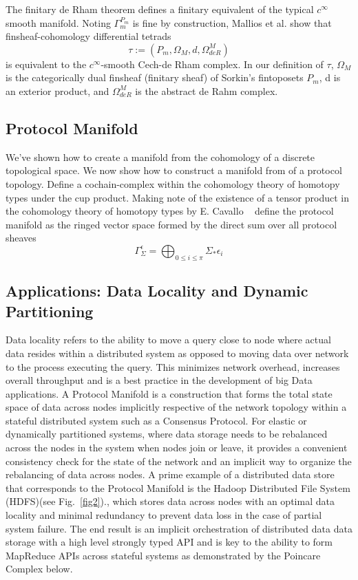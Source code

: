 \documentclass[runningheads]{llncs}
\begin{document}
The finitary de Rham theorem defines a finitary equivalent of the typical $c^{\infty}$ smooth manifold. Noting $\Gamma^{P_m}_m$ is fine by construction, Mallios et al. show that finsheaf-cohomology differential tetrads
\begin{equation}
\tau := (P_m, \Omega_M, d, \Omega^M_{deR})
\end{equation}
is equivalent to the $c^{\infty}$-smooth Cech-de Rham complex. In our definition of $\tau$, $\Omega_M$ is the categorically dual finsheaf (finitary sheaf) of Sorkin's  fintoposets $P_m$, d is an exterior product, and $ \Omega^M_{deR}$ is the abstract de Rahm complex.

\subsection{Protocol Manifold}
We've shown how to create a manifold from the cohomology of a discrete topological space. We now show how to construct a manifold from of a protocol topology. Define a cochain-complex within the cohomology theory of homotopy types under the cup product. Making note of the existence of a tensor product in the cohomology theory of homotopy types by E. Cavallo ~\cite{ref_article9} define the protocol manifold as the ringed vector space formed by the direct sum over all protocol sheaves
\begin{equation}
\Gamma^\epsilon_{\Sigma} = \bigoplus_{0 \leq i \leq \pi} \Sigma_* \epsilon_i
\end{equation}

\subsection{Applications: Data Locality and Dynamic Partitioning}
Data locality refers to the ability to move a query close to node where actual data resides within a distributed system as opposed to moving data over network to the process executing the query. This minimizes network overhead, increases overall throughput and is a best practice in the development of big Data applications. A Protocol Manifold is a construction that forms the total state space of data across nodes implicitly respective of the network topology within a stateful distributed system such as a Consensus Protocol. For elastic or dynamically partitioned systems, where data storage needs to be rebalanced across the nodes in the system when nodes join or leave, it provides a convenient consistency check for the state of the network and an implicit way to organize the rebalancing of data across nodes. A prime example of a distributed data store that corresponds to the Protocol Manifold is the Hadoop Distributed File System (HDFS)(see Fig.~\ref{fig2})., which stores data across nodes with an optimal data locality and minimal redundancy to prevent data loss in the case of partial system failure. The end result is an implicit orchestration of distributed data data storage with a high level strongly typed API and is key to the ability to form MapReduce APIs across stateful systems as demonstrated by the Poincare Complex below.
\end{document}
